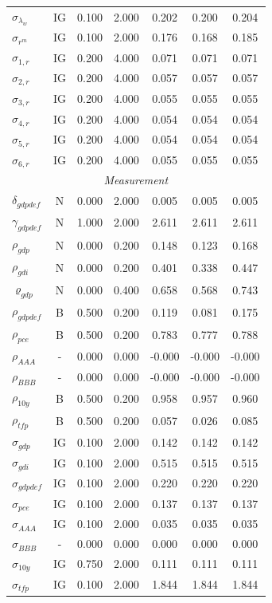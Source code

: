 \documentclass[12pt]{article}
\begin{document}
{\begin{longtable}{lcccccc}
$\sigma_{\lambda_w}$ & IG &    0.100 &    2.000 &    0.202 &    0.200 &    0.204 \\
$\sigma_{r^m}$ & IG &    0.100 &    2.000 &    0.176 &    0.168 &    0.185 \\
$\sigma_{1,r}$ & IG &    0.200 &    4.000 &    0.071 &    0.071 &    0.071 \\
$\sigma_{2,r}$ & IG &    0.200 &    4.000 &    0.057 &    0.057 &    0.057 \\
$\sigma_{3,r}$ & IG &    0.200 &    4.000 &    0.055 &    0.055 &    0.055 \\
$\sigma_{4,r}$ & IG &    0.200 &    4.000 &    0.054 &    0.054 &    0.054 \\
$\sigma_{5,r}$ & IG &    0.200 &    4.000 &    0.054 &    0.054 &    0.054 \\
$\sigma_{6,r}$ & IG &    0.200 &    4.000 &    0.055 &    0.055 &    0.055 \\
\multicolumn{7}{c}{\textit{Measurement}} \\[3pt]
$\delta_{gdpdef}$ & N &    0.000 &    2.000 &    0.005 &    0.005 &    0.005 \\
$\gamma_{gdpdef}$ & N &    1.000 &    2.000 &    2.611 &    2.611 &    2.611 \\
$\rho_{gdp}$ & N &    0.000 &    0.200 &    0.148 &    0.123 &    0.168 \\
$\rho_{gdi}$ & N &    0.000 &    0.200 &    0.401 &    0.338 &    0.447 \\
$\varrho_{gdp}$ & N &    0.000 &    0.400 &    0.658 &    0.568 &    0.743 \\
$\rho_{gdpdef}$ & B &    0.500 &    0.200 &    0.119 &    0.081 &    0.175 \\
$\rho_{pce}$ & B &    0.500 &    0.200 &    0.783 &    0.777 &    0.788 \\
$\rho_{AAA}$ & - &    0.000 &    0.000 &   -0.000 &   -0.000 &   -0.000 \\
$\rho_{BBB}$ & - &    0.000 &    0.000 &   -0.000 &   -0.000 &   -0.000 \\
$\rho_{10y}$ & B &    0.500 &    0.200 &    0.958 &    0.957 &    0.960 \\
$\rho_{tfp}$ & B &    0.500 &    0.200 &    0.057 &    0.026 &    0.085 \\
$\sigma_{gdp}$ & IG &    0.100 &    2.000 &    0.142 &    0.142 &    0.142 \\
$\sigma_{gdi}$ & IG &    0.100 &    2.000 &    0.515 &    0.515 &    0.515 \\
$\sigma_{gdpdef}$ & IG &    0.100 &    2.000 &    0.220 &    0.220 &    0.220 \\
$\sigma_{pce}$ & IG &    0.100 &    2.000 &    0.137 &    0.137 &    0.137 \\
$\sigma_{AAA}$ & IG &    0.100 &    2.000 &    0.035 &    0.035 &    0.035 \\
$\sigma_{BBB}$ & - &    0.000 &    0.000 &    0.000 &    0.000 &    0.000 \\
$\sigma_{10y}$ & IG &    0.750 &    2.000 &    0.111 &    0.111 &    0.111 \\
$\sigma_{tfp}$ & IG &    0.100 &    2.000 &    1.844 &    1.844 &    1.844 \\
\end{longtable}}
\end{document}
